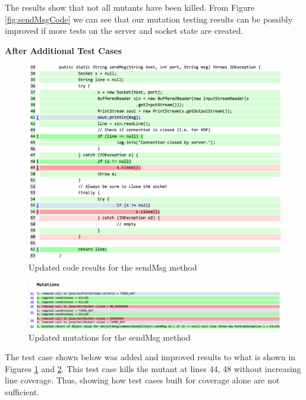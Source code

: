 \documentclass[fontsize=12pt,paper=letter,twoside]{scrartcl}
\begin{document}
The results show that not all mutants have been killed. From Figure \ref{fig:sendMsgCode} we can see that our mutation testing results can be possibly improved if more tests on the server and socket state are created. 

\clearpage
\bigskip
\fontsize{14}{5}\textbf{After Additional Test Cases}

\begin{figure}[!htb]
\begin{center}
\includegraphics[width=.99\textwidth]{images/MutationTesting/sendMsgCodeAfter.png}
\end{center}
\caption{Updated code results for the sendMsg method}
\label{fig:sendMsgCodeAfter}
\end{figure}

\begin{figure}[!htb]
\begin{center}
\includegraphics[width=.99\textwidth]{images/MutationTesting/sendMsgMutantAfter.png}
\end{center}
\caption{Updated mutations for the sendMsg method}
\label{fig:sendMsgMutantAfter}
\end{figure}

\clearpage
The test case shown below was added and improved results to what is shown in Figures \ref{fig:sendMsgCodeAfter} and \ref{fig:sendMsgMutantAfter}. This test case kills the mutant at lines 44, 48 without increasing line coverage. Thus, showing how test cases built for coverage alone are not sufficient. \\
\end{document}
